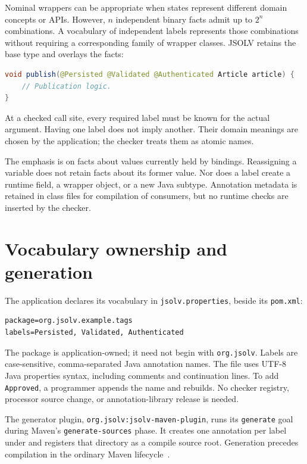 \documentclass[11pt]{article}
\newcommand{\jsolv}{\textsc{JSOLV}}
\begin{document}
Nominal wrappers can be appropriate when states represent different domain
concepts or APIs. However, $n$ independent binary facts admit up to $2^n$
combinations. A vocabulary of independent labels represents those combinations
without requiring a corresponding family of wrapper classes. \jsolv{} retains
the base type and overlays the facts:
\begin{lstlisting}[language=Java]
void publish(@Persisted @Validated @Authenticated Article article) {
    // Publication logic.
}
\end{lstlisting}
At a checked call site, every required label must be known for the actual
argument. Having one label does not imply another. Their domain meanings are
chosen by the application; the checker treats them as atomic names.

The emphasis is on facts about values currently held by bindings. Reassigning a
variable does not retain facts about its former value. Nor does a label create a
runtime field, a wrapper object, or a new Java subtype. Annotation metadata is
retained in class files for compilation of consumers, but no runtime checks are
inserted by the checker.

\section{Vocabulary ownership and generation}
\label{sec:vocabulary}

The application declares its vocabulary in \texttt{jsolv.properties}, beside its
\texttt{pom.xml}:
\begin{lstlisting}
package=org.jsolv.example.tags
labels=Persisted, Validated, Authenticated
\end{lstlisting}
The package is application-owned; it need not begin with \texttt{org.jsolv}.
Labels are case-sensitive, comma-separated Java annotation names. The file uses
UTF-8 Java properties syntax, including comments and continuation lines. To add
\texttt{Approved}, a programmer appends the name and rebuilds. No checker
registry, processor source change, or annotation-library release is needed.

The generator plugin, \texttt{org.jsolv:jsolv-maven-plugin}, runs its
\texttt{generate} goal during Maven's \texttt{generate-sources} phase.
It creates one annotation per label
under  and registers that directory as a
compile source root. Generation precedes compilation in the ordinary Maven
lifecycle~\cite{maven-lifecycle}.
\end{document}
